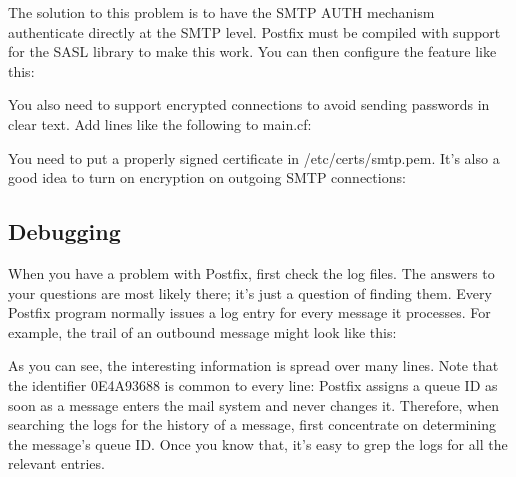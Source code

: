 The solution to this problem is to have the SMTP AUTH mechanism
authenticate directly at the SMTP level. Postfix must be compiled with
support for the SASL library to make this work. You can then configure
the feature like
this:\protect\hypertarget{part0026_split_063.htmlux5cux23_idIndexMarker2735}{}{}\protect\hypertarget{part0026_split_063.htmlux5cux23_idIndexMarker2736}{}{}


You also need to support encrypted connections to avoid sending
passwords in clear text. {Add lines like the following to
}{main.cf}{:}\protect\hypertarget{part0026_split_063.htmlux5cux23_idIndexMarker2737}{}{}


You need to put a properly signed certificate in {/etc/certs/smtp.pem}.
It's also a good idea to turn on encryption on outgoing SMTP
connections:


\protect\hypertarget{part0026_split_064.html}{}{}

\hypertarget{part0026_split_064.htmlux5cux23_idContainer1247}{}
\hypertarget{part0026_split_064.htmlux5cux23calibre_pb_63}{%
\subsection[Debugging]{\texorpdfstring{\protect\hypertarget{part0026_split_064.htmlux5cux23_idTextAnchor1194}{}{}\protect\hypertarget{part0026_split_064.htmlux5cux23_idIndexMarker2738}{}{}\protect\hypertarget{part0026_split_064.htmlux5cux23_idIndexMarker2739}{}{}\protect\hypertarget{part0026_split_064.htmlux5cux23_idTextAnchor1195}{}{}Debugging}{Debugging}}\label{part0026_split_064.htmlux5cux23calibre_pb_63}}

When you have a problem with Postfix, first check the log files. The
answers to your questions are most likely there; it's just a question of
finding them. Every Postfix program normally issues a log entry for
every message it processes. For example, the trail of an outbound
message might look like this:


As you can see, the interesting information is spread over many lines.
Note that the identifier 0E4A93688 is common to every line: Postfix
assigns a queue ID as soon as a message enters the mail system and never
changes it. Therefore, when searching the logs for the history of a
message, first concentrate on determining the message's queue ID. Once
you know that, it's easy to {grep} the logs for all the relevant
entries.


